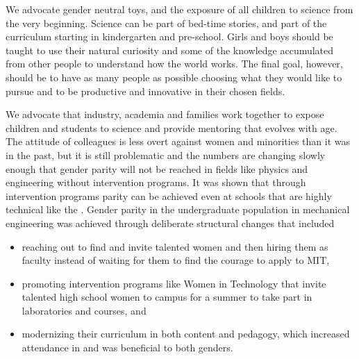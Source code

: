 \documentclass[utf8]{frontiersSCNS} %
\begin{document}
We advocate gender neutral toys, and the exposure of all children to science from the very beginning.  Science can be part of bed-time stories, and part of the curriculum starting in kindergarten and pre-school. Girls and boys should be taught to use their natural curiosity and some of the knowledge accumulated from other people to understand how the world works. The final goal, however, should be to have as many people as possible choosing what they would like to pursue and to be productive and innovative in their chosen fields. 

We advocate that industry, academia and families work together to expose children and students to science and provide mentoring that evolves with age. The attitude of colleagues is less overt against women and minorities than it was in the past, but it is still problematic and the numbers are changing slowly enough that gender parity will not be reached in fields like physics and engineering without intervention programs. It was shown that through intervention programs parity can be achieved even at schools that are highly technical like the \cite{MITpress}. Gender parity in the undergraduate population in mechanical engineering was achieved through deliberate structural changes that included 
\begin{itemize}
\item reaching out to find and invite talented women and then hiring them as faculty instead of waiting for them to find the courage to apply to MIT, 
\item promoting intervention programs like Women in Technology that invite talented high school women to campus for a summer to take part in laboratories and courses, and 
\item modernizing their curriculum in both content and pedagogy, which increased attendance in and was beneficial to both genders.
\end{itemize}
\end{document}
